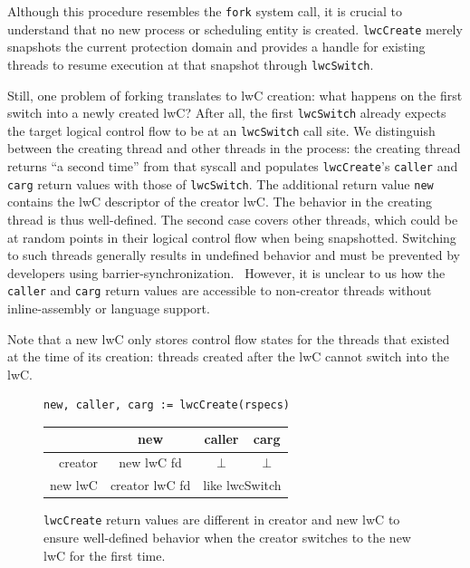 \documentclass[10pt,twocolumn,a4paper]{article}
\begin{document}
Although this procedure resembles the \lstinline{fork} system call, it is crucial to understand that no new process or scheduling entity is created.
\lstinline{lwcCreate} merely snapshots the current protection domain and provides a handle for existing threads to resume execution at that snapshot through \lstinline{lwcSwitch}.

Still, one problem of forking translates to lwC creation:
what happens on the first switch into a newly created lwC?
After all, the first \lstinline{lwcSwitch} already expects the target logical control flow to be at an \lstinline{lwcSwitch} call site.
We distinguish between the creating thread and other threads in the process:
the creating thread returns \enquote{a second time} from that syscall and populates \lstinline{lwcCreate}'s \lstinline{caller} and \lstinline{carg} return values with those of \lstinline{lwcSwitch}.
The additional return value \lstinline{new} contains the lwC descriptor of the creator lwC.
The behavior in the creating thread is thus well-defined.
The second case covers other threads, which could be at random points in their logical control flow when being snapshotted.
Switching to such threads generally results in undefined behavior and must be prevented by developers using barrier-synchronization.~\cite{lwcpaper}
However, it is unclear to us how the \lstinline{caller} and \lstinline{carg} return values are accessible to non-creator threads without inline-assembly or language support.

Note that a new lwC only stores control flow states for the threads that existed at the time of its creation:
threads created after the lwC cannot switch into the lwC.

\vspace{1.5em}
\begin{figure}[h]
  \centering
  \begin{framed}
\begin{lstlisting}[mathescape,aboveskip=0pt]
  new, caller, carg := lwcCreate(rspecs)
\end{lstlisting}
\begin{tabular}{|r||c|c|c|}
  \hline
                &   new        & caller       & carg \\
  \hline\hline
  creator       & new lwC fd   & $\bot$      & $\bot$\\
  \hline
  new lwC       &    creator lwC fd   & \multicolumn{2}{c|}{like lwcSwitch}\\
  \hline
\end{tabular}
\end{framed}
\caption{
  \texttt{lwcCreate} return values are different in creator and new lwC to ensure well-defined behavior when the creator switches to the new lwC for the first time.
  \label{design:fig:lwcCreate}
}
\end{figure}
\end{document}
